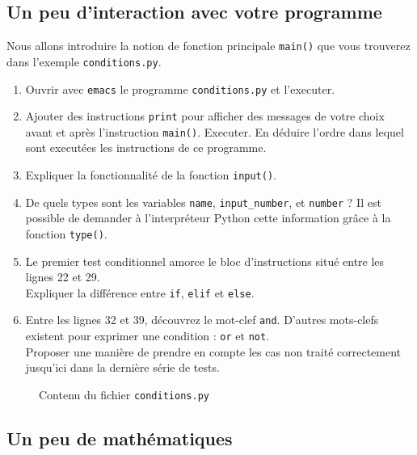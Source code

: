 \subsection{Un peu d'interaction avec votre programme}




Nous  allons introduire  la  notion de  fonction
principale   \texttt{main()}  que   vous   trouverez  dans   l'exemple
\texttt{conditions.py}.


\begin{enumerate}

\item Ouvrir avec  \texttt{emacs} le  programme \texttt{conditions.py}
  et l'executer.
\item Ajouter des instructions \verb+print+
  pour afficher des messages de votre choix avant et après
  l'instruction \verb+main()+. Executer.
  En déduire l'ordre dans lequel sont executées les instructions de
  ce programme. 
\item Expliquer la fonctionnalité de la fonction \texttt{input()}.
\item De quels types sont les variables \texttt{name},
  \texttt{input\_number},
  et \texttt{number} ?
  Il est possible de demander à l'interpréteur Python cette
  information grâce à la fonction \texttt{type()}.


\item Le premier test conditionnel amorce le bloc d'instructions
  situé entre  les lignes 22  et 29.\\ Expliquer la  différence entre
  \texttt{if}, \texttt{elif} et \texttt{else}.

\item  Entre   les  lignes  32   et  39,  découvrez  le   mot-clef
  \texttt{and}. D'autres mots-clefs existent pour
  exprimer une condition  : \texttt{or}  et \texttt{not}.\\
  Proposer une manière de prendre en compte les cas non traité
  correctement jusqu'ici dans la dernière série de tests.
\end{enumerate}


\begin{figure}  
  
  \caption{Contenu du fichier \texttt{conditions.py}}
  \label{polynome_conditions}
\end{figure}



\subsection{Un peu de mathématiques}

